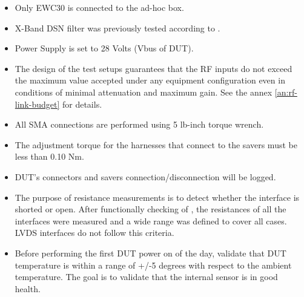 \begin{itemize}
\item Only EWC30 is connected to the ad-hoc box.

\item X-Band DSN filter was previously tested according to .


\item \comEgse{} Power Supply is set to 28 Volts (Vbus of DUT).


\item The design of the test setups guarantees that the RF inputs do not exceed the maximum value accepted under any equipment configuration even in conditions of minimal attenuation and maximum gain.
See the annex \ref{an:rf-link-budget} for details.

\item All SMA connections are performed using 5 lb-inch torque wrench.

\item The adjustment torque for the harnesses that connect to 
the savers must be less than 0.10 Nm.

\item DUT’s connectors and savers connection/disconnection will be logged.

\item The purpose of resistance measurements is to detect whether the interface is shorted or open.
After functionally checking of \comEgse, the resistances of all the interfaces were measured and a wide range was defined to cover all cases. LVDS interfaces do not follow this criteria.

\item Before performing the first DUT power on of the day, validate that DUT temperature is within a range of +/-5 degrees with respect to the ambient temperature. The goal is to validate that the internal sensor is in good health.
\end{itemize}

